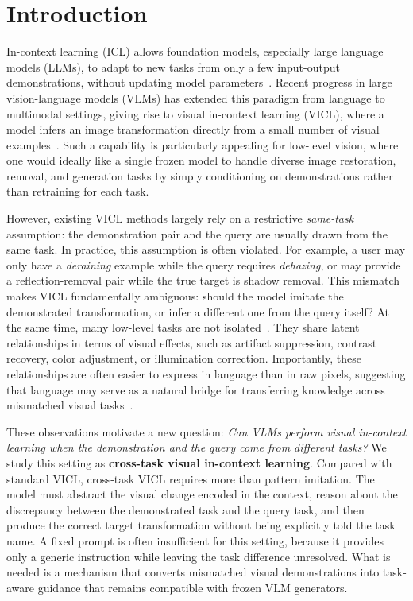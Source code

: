 \section{Introduction}
\label{sec:intro}

In-context learning (ICL) allows foundation models, especially large language models (LLMs), to adapt to new tasks from only a few input-output demonstrations, without updating model parameters~\cite{min2022rethinking, dong2022survey, highmore2024context, wang2023large, sia2024does, li2025large}.
Recent progress in large vision-language models (VLMs) has extended this paradigm from language to multimodal settings, giving rise to visual in-context learning (VICL), where a model infers an image transformation directly from a small number of visual examples~\cite{bar2022visual, wang2023painter, wang2023incontext, xprompt2024universal, zhou2024visual, ma2024vision}.
Such a capability is particularly appealing for low-level vision, where one would ideally like a single frozen model to handle diverse image restoration, removal, and generation tasks by simply conditioning on demonstrations rather than retraining for each task.

However, existing VICL methods largely rely on a restrictive \emph{same-task} assumption: the demonstration pair and the query are usually drawn from the same task. In practice, this assumption is often violated. For example, a user may only have a \emph{deraining} example while the query requires \emph{dehazing}, or may provide a reflection-removal pair while the true target is shadow removal. This mismatch makes VICL fundamentally ambiguous: should the model imitate the demonstrated transformation, or infer a different one from the query itself? At the same time, many low-level tasks are not isolated~\cite{zamir2018taskonomy, pal2019tmt, achille2019task2vec, bao2019information}. They share latent relationships in terms of visual effects, such as artifact suppression, contrast recovery, color adjustment, or illumination correction. Importantly, these relationships are often easier to express in language than in raw pixels, suggesting that language may serve as a natural bridge for transferring knowledge across mismatched visual tasks~\cite{trigka2025comprehensive, shu2024visual, brooks2023instructpix2pix, potlapalli2023promptir, conde2024instructir, ke2023neural}.

These observations motivate a new question: \emph{Can VLMs perform visual in-context learning when the demonstration and the query come from different tasks?} We study this setting as \textbf{cross-task visual in-context learning}. Compared with standard VICL, cross-task VICL requires more than pattern imitation. The model must abstract the visual change encoded in the context, reason about the discrepancy between the demonstrated task and the query task, and then produce the correct target transformation without being explicitly told the task name. A fixed prompt is often insufficient for this setting, because it provides only a generic instruction while leaving the task difference unresolved. What is needed is a mechanism that converts mismatched visual demonstrations into task-aware guidance that remains compatible with frozen VLM generators.

